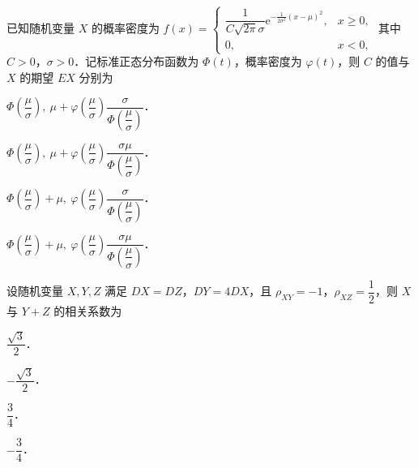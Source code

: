 \begin{question}[index=9]
已知随机变量 $X$ 的概率密度为
$f(x)=\begin{cases}
\dfrac{1}{C\sqrt{2\pi}\sigma}\mathrm e^{-\frac{1}{2\sigma^2}(x-\mu)^2},&x\geq 0,\\
0,&x<0,
\end{cases}$
其中 $C>0$，$\sigma>0$．记标准正态分布函数为 $\Phi(t)$，概率密度为 $\varphi(t)$，则 $C$ 的值与 $X$ 的期望 $EX$ 分别为
\begin{choices}[columns=2,label-pos=left]
\item $\Phi\left(\dfrac{\mu}{\sigma}\right),\
\mu+\varphi\left(\dfrac{\mu}{\sigma}\right)\dfrac{\sigma}{\Phi\left(\dfrac{\mu}{\sigma}\right)}$．
\item $\Phi\left(\dfrac{\mu}{\sigma}\right),\
\mu+\varphi\left(\dfrac{\mu}{\sigma}\right)\dfrac{\sigma\mu}{\Phi\left(\dfrac{\mu}{\sigma}\right)}$．
\item $\Phi\left(\dfrac{\mu}{\sigma}\right)+\mu,\
\varphi\left(\dfrac{\mu}{\sigma}\right)\dfrac{\sigma}{\Phi\left(\dfrac{\mu}{\sigma}\right)}$．
\item $\Phi\left(\dfrac{\mu}{\sigma}\right)+\mu,\
\varphi\left(\dfrac{\mu}{\sigma}\right)\dfrac{\sigma\mu}{\Phi\left(\dfrac{\mu}{\sigma}\right)}$．
\end{choices}
\end{question}
\QuestionBreak

\begin{question}[index=10]
设随机变量 $X,Y,Z$ 满足 $DX=DZ$，$DY=4DX$，且 $\rho_{XY}=-1$，$\rho_{XZ}=\dfrac12$，则 $X$ 与 $Y+Z$ 的相关系数为
\begin{choices}[columns=4,label-pos=left]
\item $\dfrac{\sqrt3}{2}$．
\item $-\dfrac{\sqrt3}{2}$．
\item $\dfrac34$．
\item $-\dfrac34$．
\end{choices}
\end{question}
